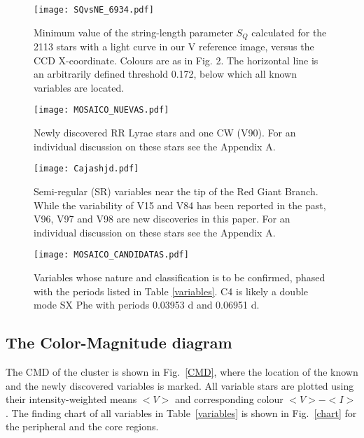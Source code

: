 \documentclass[journal]{rmaa}
\newcommand{\1}{\'{\i}}
\begin{document}
\begin{figure}
\texttt{[image: SQvsNE\_6934.pdf]}
\caption{Minimum value of the string-length parameter $S_Q$ calculated
for the 2113 stars with a light curve in our V reference image, versus
the CCD X-coordinate. Colours are as in Fig. 2. The horizontal line is an
arbitrarily defined threshold 0.172, below which all known variables are located.}
    \label{SQ}
\end{figure}

\begin{figure}
\texttt{[image: MOSAICO\_NUEVAS.pdf]}
\caption{Newly discovered RR Lyrae stars and one CW (V90). For an individual
discussion on these stars see the Appendix A.}
    \label{New_var}
\end{figure}

\begin{figure}
\texttt{[image: Cajashjd.pdf]}
\caption{Semi-regular (SR) variables near the tip of the Red Giant Branch.
While the variability of V15 and V84 has been reported in the past,
V96, V97 and V98 are new discoveries in this paper.
For an individual discussion on these stars see the Appendix A.}
    \label{SR_HJD}
\end{figure}

\begin{figure}
\texttt{[image: MOSAICO\_CANDIDATAS.pdf]}
\caption{Variables whose nature and classification is to be confirmed, phased with the
periods listed in Table \ref{variables}. C4 is likely a double mode SX Phe with
periods 0.03953 d and 0.06951 d.}
    \label{Cand}
\end{figure}


\subsection{The Color-Magnitude diagram}

The CMD of the cluster is shown in Fig.~\ref{CMD}, where the location of the
known and the newly discovered
variables is marked. All variable stars are plotted using their intensity-weighted
means $< V >$ and corresponding colour $<V> - <I>$.  The finding chart of all
variables in
Table~\ref{variables} is shown in Fig.~\ref{chart} for the peripheral and the
core regions.

\end{document}
